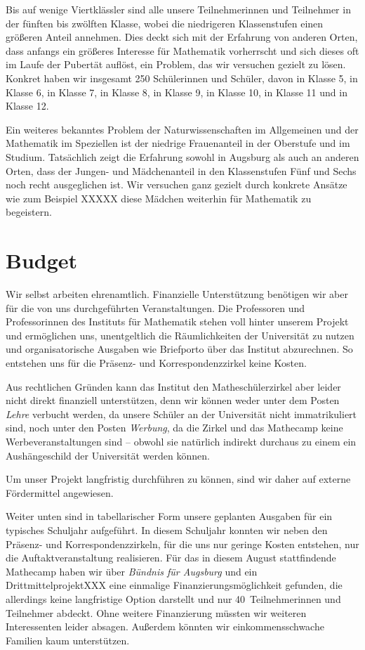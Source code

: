 \documentclass[12pt]{zettel}
\begin{document}
Bis auf wenige Viertklässler sind alle unsere Teilnehmerinnen und
Teilnehmer in der fünften bis zwölften Klasse, wobei die niedrigeren
Klassenstufen einen größeren Anteil annehmen. Dies deckt sich mit der
Erfahrung von anderen Orten, dass anfangs ein größeres Interesse für
Mathematik vorherrscht und sich dieses oft im Laufe der Pubertät
auflöst, ein Problem, das wir versuchen gezielt zu lösen. Konkret haben
wir insgesamt 250 Schülerinnen und Schüler, davon in Klasse 5, in Klasse
6, in Klasse 7, in Klasse 8, in Klasse 9, in Klasse 10, in Klasse 11 und
in Klasse 12.

Ein weiteres bekanntes Problem der Naturwissenschaften im Allgemeinen
und der Mathematik im Speziellen ist der niedrige Frauenanteil in der
Oberstufe und im Studium. Tatsächlich zeigt die Erfahrung sowohl in
Augsburg als auch an anderen Orten, dass der Jungen- und Mädchenanteil
in den Klassenstufen Fünf und Sechs noch recht ausgeglichen ist. Wir
versuchen ganz gezielt durch konkrete Ansätze wie zum Beispiel XXXXX
diese Mädchen weiterhin für Mathematik zu begeistern.


\section{Budget}

Wir selbst arbeiten ehrenamtlich. Finanzielle Unterstützung benötigen wir aber
für die von uns durchgeführten Veranstaltungen. Die Professoren und
Professorinnen des Instituts für Mathematik stehen voll hinter unserem Projekt
und ermöglichen uns, unentgeltlich die Räumlichkeiten der Universität zu nutzen
und organisatorische Ausgaben wie Briefporto über das Institut abzurechnen.
So entstehen uns für die Präsenz- und Korrespondenzzirkel keine Kosten.

Aus rechtlichen Gründen kann das Institut den Matheschülerzirkel aber leider nicht
direkt finanziell unterstützen, denn wir können weder unter dem Posten
\emph{Lehre} verbucht werden, da unsere Schüler an der Universität nicht
immatrikuliert sind, noch unter den Posten \emph{Werbung}, da die Zirkel und
das Mathecamp keine Werbeveranstaltungen sind -- obwohl sie natürlich indirekt
durchaus zu einem ein Aushängeschild der Universität werden können.

Um unser Projekt langfristig durchführen zu können, sind wir daher auf externe
Fördermittel angewiesen.

Weiter unten sind in tabellarischer Form unsere geplanten Ausgaben für ein
typisches Schuljahr aufgeführt. In diesem Schuljahr konnten wir
neben den Präsenz- und Korrespondenzzirkeln, für die uns nur geringe Kosten
entstehen, nur die Auftaktveranstaltung realisieren. Für das in diesem August
stattfindende Mathecamp haben wir über \emph{Bündnis für Augsburg} und ein
DrittmittelprojektXXX eine einmalige Finanzierungsmöglichkeit gefunden, die
allerdings keine langfristige Option darstellt und nur 40~Teilnehmerinnen und
Teilnehmer abdeckt. Ohne weitere Finanzierung müssten wir weiteren
Interessenten leider absagen. Außerdem könnten wir einkommensschwache Familien
kaum unterstützen.
\end{document}
